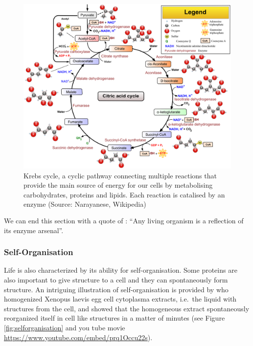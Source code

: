 \documentclass[
  11pt,
]{book}
\begin{document}
\begin{figure}

{\centering \includegraphics[width=0.7\linewidth]{./figs/Citric_acid_cycle_with_aconitate_2} 

}

\caption{Krebs cycle, a cyclic pathway connecting multiple reactions that provide the main source of energy for our cells by metabolising carbohydrates, proteins and lipids. Each reaction is catalised by an enzyme  (Source: Narayanese, Wikipedia)}\label{fig:krebsCycle}
\end{figure}

We can end this section with a quote of \citet{deDuve2002}: ``Any living organism is a reflection of its enzyme arsenal''.

\newpage

\hypertarget{self-organisation}{%
\subsubsection{Self-Organisation}\label{self-organisation}}

Life is also characterized by its ability for self-organisation. Some proteins are also important to give structure to a cell and they can spontaneously form structure.
An intriguing illustration of self-organisation is provided by \citet{Cheng2019} who
homogenized Xenopus laevis egg cell cytoplasma extracts, i.e.~the liquid with structures from the cell, and showed that the homogeneous extract spontaneously reorganized itself in cell like structures in a matter of minutes (see Figure \ref{fig:selforganisation} and you tube movie \url{https://www.youtube.com/embed/prq1Occu22s}).
\end{document}
